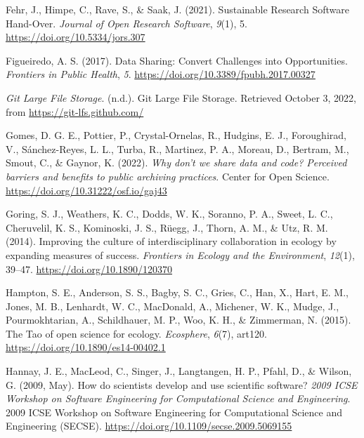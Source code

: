 \begin{CSLReferences}{1}{0}
\leavevmode{}%
Fehr, J., Himpe, C., Rave, S., \& Saak, J. (2021). Sustainable Research Software Hand-Over. \emph{Journal of Open Research Software}, \emph{9}(1), 5. \url{https://doi.org/10.5334/jors.307}

\leavevmode{}%
Figueiredo, A. S. (2017). Data Sharing: Convert Challenges into Opportunities. \emph{Frontiers in Public Health}, \emph{5}. \url{https://doi.org/10.3389/fpubh.2017.00327}

\leavevmode{}%
\emph{Git Large File Storage}. (n.d.). Git Large File Storage. Retrieved October 3, 2022, from \url{https://git-lfs.github.com/}

\leavevmode{}%
Gomes, D. G. E., Pottier, P., Crystal-Ornelas, R., Hudgins, E. J., Foroughirad, V., Sánchez-Reyes, L. L., Turba, R., Martinez, P. A., Moreau, D., Bertram, M., Smout, C., \& Gaynor, K. (2022). \emph{Why don't we share data and code? Perceived barriers and benefits to public archiving practices}. Center for Open Science. \url{https://doi.org/10.31222/osf.io/gaj43}

\leavevmode{}%
Goring, S. J., Weathers, K. C., Dodds, W. K., Soranno, P. A., Sweet, L. C., Cheruvelil, K. S., Kominoski, J. S., Rüegg, J., Thorn, A. M., \& Utz, R. M. (2014). Improving the culture of interdisciplinary collaboration in ecology by expanding measures of success. \emph{Frontiers in Ecology and the Environment}, \emph{12}(1), 39--47. \url{https://doi.org/10.1890/120370}

\leavevmode{}%
Hampton, S. E., Anderson, S. S., Bagby, S. C., Gries, C., Han, X., Hart, E. M., Jones, M. B., Lenhardt, W. C., MacDonald, A., Michener, W. K., Mudge, J., Pourmokhtarian, A., Schildhauer, M. P., Woo, K. H., \& Zimmerman, N. (2015). The Tao of open science for ecology. \emph{Ecosphere}, \emph{6}(7), art120. \url{https://doi.org/10.1890/es14-00402.1}

\leavevmode{}%
Hannay, J. E., MacLeod, C., Singer, J., Langtangen, H. P., Pfahl, D., \& Wilson, G. (2009, May). How do scientists develop and use scientific software? \emph{2009 ICSE Workshop on Software Engineering for Computational Science and Engineering}. 2009 ICSE Workshop on Software Engineering for Computational Science and Engineering (SECSE). \url{https://doi.org/10.1109/secse.2009.5069155}


\end{CSLReferences}
